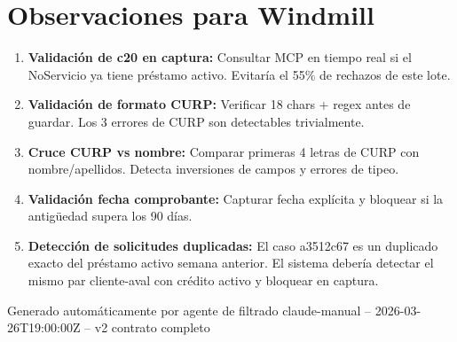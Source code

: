\documentclass[11pt,a4paper]{article}
\begin{document}
\section{Observaciones para Windmill}

\begin{enumerate}
  \item \textbf{Validaci\'on de c20 en captura:} Consultar MCP en tiempo real si el NoServicio
    ya tiene pr\'estamo activo. Evitar\'ia el 55\% de rechazos de este lote.
  \item \textbf{Validaci\'on de formato CURP:} Verificar 18 chars + regex antes de guardar.
    Los 3 errores de CURP son detectables trivialmente.
  \item \textbf{Cruce CURP vs nombre:} Comparar primeras 4 letras de CURP con nombre/apellidos.
    Detecta inversiones de campos y errores de tipeo.
  \item \textbf{Validaci\'on fecha comprobante:} Capturar fecha expl\'icita y bloquear si
    la antig\"uedad supera los 90 d\'ias.
  \item \textbf{Detecci\'on de solicitudes duplicadas:} El caso a3512c67 es un duplicado exacto
    del pr\'estamo activo semana anterior. El sistema deber\'ia detectar el mismo par cliente-aval
    con cr\'edito activo y bloquear en captura.
\end{enumerate}

\vspace{1em}
\begin{center}
  {\small\color{gris} Generado autom\'aticamente por agente de filtrado claude-manual --
  2026-03-26T19:00:00Z -- v2 contrato completo}
\end{center}
\end{document}
